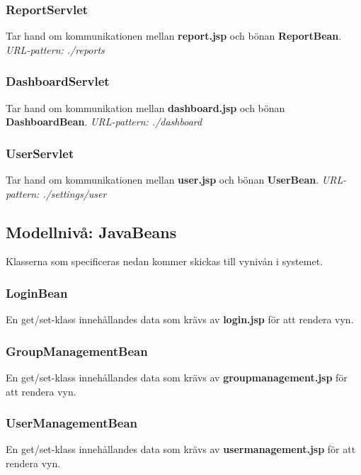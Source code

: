 \documentclass[paper=a4, fontsize=11pt,twoside]{article}
\begin{document}
\subsubsection{ ReportServlet}
Tar hand om kommunikationen mellan \textbf{report.jsp} och bönan \textbf{ReportBean}. \newline
\newline
\textit{URL-pattern: ./reports}

\subsubsection{DashboardServlet}
Tar hand om kommunikation mellan \textbf{dashboard.jsp} och bönan \textbf{DashboardBean}.\newline
\newline
\textit{URL-pattern: ./dashboard}

\subsubsection{UserServlet}
Tar hand om kommunikationen mellan \textbf{user.jsp} och bönan \textbf{UserBean}.\newline
\newline
\textit{URL-pattern: ./settings/user}

\subsection{Modellnivå: JavaBeans}
Klasserna som specificeras nedan kommer skickas till vynivån i systemet.

\subsubsection{LoginBean}
En get/set-klass innehållandes data som krävs av \textbf{login.jsp} för att rendera vyn.

\subsubsection{GroupManagementBean}
En get/set-klass innehållandes data som krävs av \textbf{groupmanagement.jsp} för att rendera vyn.

\subsubsection{UserManagementBean}
En get/set-klass innehållandes data som krävs av \textbf{usermanagement.jsp} för att rendera vyn.
\end{document}
